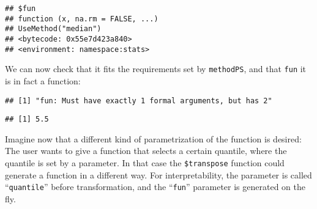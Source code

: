 \documentclass[
]{scrbook}
\newenvironment{Shaded}{\begin{snugshade}}{\end{snugshade}}
\newcommand{\AttributeTok}[1]{\textcolor[rgb]{0.77,0.63,0.00}{#1}}
\newcommand{\CommentTok}[1]{\textcolor[rgb]{0.56,0.35,0.01}{\textit{#1}}}
\newcommand{\ControlFlowTok}[1]{\textcolor[rgb]{0.13,0.29,0.53}{\textbf{#1}}}
\newcommand{\DecValTok}[1]{\textcolor[rgb]{0.00,0.00,0.81}{#1}}
\newcommand{\FunctionTok}[1]{\textcolor[rgb]{0.00,0.00,0.00}{#1}}
\newcommand{\NormalTok}[1]{#1}
\newcommand{\OtherTok}[1]{\textcolor[rgb]{0.56,0.35,0.01}{#1}}
\newcommand{\SpecialCharTok}[1]{\textcolor[rgb]{0.00,0.00,0.00}{#1}}
\newcommand{\StringTok}[1]{\textcolor[rgb]{0.31,0.60,0.02}{#1}}
\renewenvironment{Shaded} {\begin{snugshade}\small} {\end{snugshade}}
\begin{document}
\begin{verbatim}
## $fun
## function (x, na.rm = FALSE, ...) 
## UseMethod("median")
## <bytecode: 0x55e7d423a840>
## <environment: namespace:stats>
\end{verbatim}

We can now check that it fits the requirements set by \texttt{methodPS}, and that \texttt{fun} it is in fact a function:

\begin{Shaded}
\end{Shaded}

\begin{verbatim}
## [1] "fun: Must have exactly 1 formal arguments, but has 2"
\end{verbatim}

\begin{Shaded}
\end{Shaded}

\begin{verbatim}
## [1] 5.5
\end{verbatim}

Imagine now that a different kind of parametrization of the function is desired:
The user wants to give a function that selects a certain quantile, where the quantile is set by a parameter.
In that case the \texttt{\$transpose} function could generate a function in a different way.
For interpretability, the parameter is called ``\texttt{quantile}'' before transformation, and the ``\texttt{fun}'' parameter is generated on the fly.

\begin{Shaded}
\end{Shaded}
\end{document}
